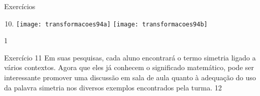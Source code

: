 \clearmargin
\begin{answer}{Exercícios}
{\exerciselist
\begin{enumerate}\setcounter{enumi}{9}
\item 
{}
{
\texttt{[image: transformacoes94a]}
}
\texttt{[image: transformacoes94b]}
\end{enumerate}
}{1}
\end{answer}
\clearmargin
\begin{sugestions}{Exercício 11}
{
Em suas pesquisas, cada aluno encontrará o termo simetria ligado a vários contextos. Agora que eles já conhecem o significado matemático, pode ser interessante promover uma discussão em sala de aula quanto à adequação do uso da palavra simetria nos diversos exemplos encontrados pela turma.
}{1}{2}
\end{sugestions}

\exercise
{}\label{transformacoes-exercise4}

